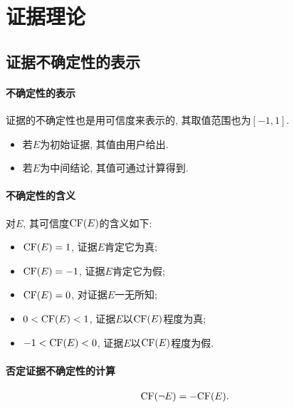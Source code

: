 \section{证据理论}
\subsection{证据不确定性的表示}
\paragraph{不确定性的表示}
    证据的不确定性也是用可信度来表示的, 其取值范围也为$[-1,1]$.　
\begin{itemize}
    \item 若$E$为初始证据, 其值由用户给出.
    \item 若$E$为中间结论, 其值可通过计算得到.
\end{itemize}
\paragraph{不确定性的含义}
对$E$, 其可信度$\textup{CF}(E)$的含义如下:
\begin{center}
\begin{itemize}
    \item $\textup{CF}(E)=1$, 证据$E$肯定它为真;
    \item $\textup{CF}(E)=-1$, 证据$E$肯定它为假;
    \item $\textup{CF}(E)=0$, 对证据$E$一无所知;
    \item $0<\textup{CF}(E)<1$, 证据$E$以$\textup{CF}(E)$程度为真;
    \item $-1<\textup{CF}(E)<0$, 证据$E$以$\textup{CF}(E)$程度为假.
\end{itemize}
\end{center}
\paragraph{否定证据不确定性的计算}
\begin{align}
    \textup{CF}(\neg E)=-\textup{CF}(E).
\end{align}
